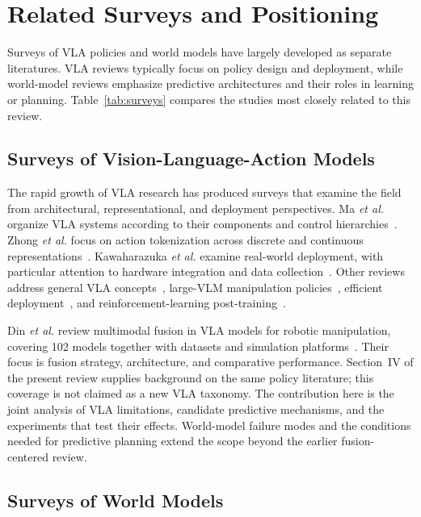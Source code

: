 \documentclass{ieeeaccess}
\begin{document}
\section{Related Surveys and Positioning}
\label{sec:related}

Surveys of VLA policies and world models have largely developed as separate literatures. VLA reviews typically focus on policy design and deployment, while world-model reviews emphasize predictive architectures and their roles in learning or planning. Table~\ref{tab:surveys} compares the studies most closely related to this review.

\subsection{Surveys of Vision-Language-Action Models}

The rapid growth of VLA research has produced surveys that examine the field from architectural, representational, and deployment perspectives. Ma \emph{et al.} organize VLA systems according to their components and control hierarchies~\cite{ma2024survey}. Zhong \emph{et al.} focus on action tokenization across discrete and continuous representations~\cite{zhong2025token}. Kawaharazuka \emph{et al.} examine real-world deployment, with particular attention to hardware integration and data collection~\cite{kawaharazuka2025}. Other reviews address general VLA concepts~\cite{sapkota2025}, large-VLM manipulation policies~\cite{shao2025}, efficient deployment~\cite{yu2025efficient}, and reinforcement-learning post-training~\cite{deng2025rl}.

\textcolor[RGB]{104,48,148}{Din \emph{et al.} review multimodal fusion in VLA models for robotic manipulation, covering 102 models together with datasets and simulation platforms~\cite{din2025priorvlasurvey}. Their focus is fusion strategy, architecture, and comparative performance. Section~IV of the present review supplies background on the same policy literature; this coverage is not claimed as a new VLA taxonomy. The contribution here is the joint analysis of VLA limitations, candidate predictive mechanisms, and the experiments that test their effects. World-model failure modes and the conditions needed for predictive planning extend the scope beyond the earlier fusion-centered review.}

\subsection{Surveys of World Models}
\end{document}
